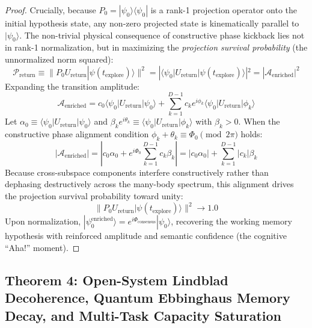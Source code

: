 \documentclass[10pt,twocolumn,3p]{article}
\begin{document}
\begin{proof}
Crucially, because $P_0 = |\psi_0\rangle \langle \psi_0|$ is a rank-1 projection operator onto the initial hypothesis state, any non-zero projected state is kinematically parallel to $|\psi_0\rangle$. The non-trivial physical consequence of constructive phase kickback lies not in rank-1 normalization, but in maximizing the \emph{projection survival probability} (the unnormalized norm squared):
\begin{equation}
    \mathcal{P}_{\text{return}} \equiv \| P_0 U_{\text{return}} |\psi(t_{\text{explore}})\rangle \|^2 = |\langle \psi_0 | U_{\text{return}} |\psi(t_{\text{explore}})\rangle|^2 = |\mathcal{A}_{\text{enriched}}|^2
\end{equation}
Expanding the transition amplitude:
\begin{equation}
    \mathcal{A}_{\text{enriched}} = c_0 \langle \psi_0 | U_{\text{return}} | \psi_0 \rangle + \sum_{k=1}^{D-1} c_k e^{i \phi_k} \langle \psi_0 | U_{\text{return}} | \phi_k \rangle
\end{equation}
Let $\alpha_0 \equiv \langle \psi_0 | U_{\text{return}} | \psi_0 \rangle$ and $\beta_k e^{i \theta_k} \equiv \langle \psi_0 | U_{\text{return}} | \phi_k \rangle$ with $\beta_k > 0$. When the constructive phase alignment condition $\phi_k + \theta_k \equiv \Phi_0 \pmod{2\pi}$ holds:
\begin{equation}
    |\mathcal{A}_{\text{enriched}}| = \left| c_0 \alpha_0 + e^{i \Phi_0} \sum_{k=1}^{D-1} c_k \beta_k \right| = |c_0 \alpha_0| + \sum_{k=1}^{D-1} |c_k| \beta_k
\end{equation}
Because cross-subspace components interfere constructively rather than dephasing destructively across the many-body spectrum, this alignment drives the projection survival probability toward unity:
\begin{equation}
    \boxed{\| P_0 U_{\text{return}} |\psi(t_{\text{explore}})\rangle \|^2 \to 1.0}
\end{equation}
Upon normalization, $|\psi_0^{\text{enriched}}\rangle = e^{i \Phi_{\text{consensus}}} |\psi_0\rangle$, recovering the working memory hypothesis with reinforced amplitude and semantic confidence (the cognitive ``Aha!'' moment).
\end{proof}

\subsection{Theorem 4: Open-System Lindblad Decoherence, Quantum Ebbinghaus Memory Decay, and Multi-Task Capacity Saturation}
\label{subsec:thm_ebbinghaus_capacity}
\end{document}
